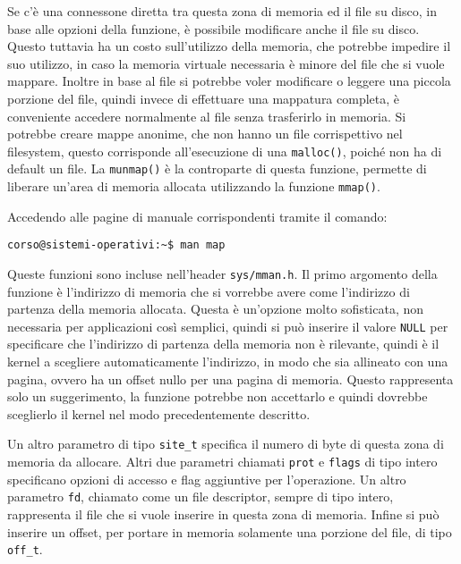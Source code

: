 \documentclass{article}
\numberwithin{equation}{subsection}
\begin{document}
Se c'è una connessone diretta tra questa zona di memoria ed il file su disco, in base alle opzioni 
della funzione, è possibile modificare anche il file su disco. Questo tuttavia ha un costo 
sull'utilizzo della memoria, che potrebbe impedire il suo utilizzo, in caso la memoria virtuale 
necessaria è minore del file che si vuole mappare. Inoltre in base al file si potrebbe voler 
modificare o leggere una piccola porzione del file, quindi invece di effettuare una mappatura 
completa, è conveniente accedere normalmente al file senza trasferirlo in memoria. 
Si potrebbe creare mappe anonime, che non hanno un file corrispettivo nel filesystem, questo 
corrisponde all'esecuzione di una \verb|malloc()|, poiché non ha di default un file.  
La \verb|munmap()| è la controparte di questa funzione, permette di liberare un'area di memoria 
allocata utilizzando la funzione \verb|mmap()|. 

Accedendo alle pagine di manuale corrispondenti tramite il comando:
\begin{verbatim}
corso@sistemi-operativi:~$ man map
\end{verbatim}

Queste funzioni sono incluse nell'header \verb|sys/mman.h|. Il primo argomento della funzione è 
l'indirizzo di memoria che si vorrebbe avere come l'indirizzo di partenza della memoria 
allocata. Questa è un'opzione molto sofisticata, non necessaria per applicazioni così semplici, 
quindi si può inserire il valore \verb|NULL| per specificare che l'indirizzo di partenza della memoria non 
è rilevante, quindi è il kernel a scegliere automaticamente l'indirizzo, in modo che sia 
allineato con una pagina, ovvero ha un offset nullo per una pagina di memoria. 
Questo rappresenta solo un suggerimento, la funzione potrebbe non accettarlo e quindi dovrebbe 
sceglierlo il kernel nel modo precedentemente descritto. 

Un altro parametro di tipo \verb|site_t| specifica il numero di byte di questa zona di memoria da 
allocare. Altri due parametri chiamati \verb|prot| e \verb|flags| di tipo intero specificano 
opzioni di accesso e flag aggiuntive per l'operazione. Un altro parametro \verb|fd|, chiamato 
come un file descriptor, sempre di tipo intero, rappresenta il file che si vuole inserire in questa zona di memoria. Infine si può inserire un offset, per portare in memoria solamente una 
porzione del file, di tipo \verb|off_t|. 
\end{document}
